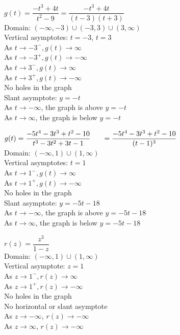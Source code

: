 \begin{exenum}
\item $g(t) = \dfrac{-t^{3} + 4t}{t^{2} - 9} = \dfrac{-t^{3} + 4t}{(t-3)(t+3)} $\\
Domain: $(-\infty, -3) \cup (-3, 3) \cup (3, \infty)$\\
Vertical asymptotes: $t = -3$, $t=3$\\
As $t \rightarrow -3^{-}, g(t) \rightarrow \infty$\\
As $t \rightarrow -3^{+}, g(t) \rightarrow -\infty$\\
As $t \rightarrow 3^{-}, g(t) \rightarrow \infty$\\
As $t \rightarrow 3^{+}, g(t) \rightarrow -\infty$\\
No holes in the graph \\
Slant asymptote: $y=-t$ \\
As $t \rightarrow -\infty$, the graph is above $y=-t$\\
As $t \rightarrow \infty$, the graph is below $y=-t$\\

\item \small $g(t) = \dfrac{-5t^{4} - 3t^{3} + t^{2} - 10}{t^{3} - 3t^{2} + 3t - 1} \\ \phantom{g(t)} = \dfrac{-5t^{4} - 3t^{3} + t^{2} - 10}{(t-1)^3} $ \normalsize \\
Domain: $(-\infty, 1) \cup (1, \infty)$\\
Vertical asymptotes: $t = 1$\\
As $t \rightarrow 1^{-}, g(t) \rightarrow \infty$\\
As $t \rightarrow 1^{+}, g(t) \rightarrow -\infty$\\
No holes in the graph \\
Slant asymptote: $y=-5t-18$ \\
 \small  As $t \rightarrow -\infty$, the graph is above $y=-5t-18$ \normalsize\\
 \small  As $t \rightarrow \infty$, the graph is below $y=-5t-18$ \normalsize \\

\item $r(z) = \dfrac{z^3}{1-z}$\\
Domain: $(-\infty, 1) \cup (1, \infty)$\\
Vertical asymptote: $z=1$\\
As $z \rightarrow 1^{-}, r(z) \rightarrow \infty$\\
As $z \rightarrow 1^{+}, r(z) \rightarrow -\infty$\\
No holes in the graph \\
No horizontal or slant asymptote \\
As $z \rightarrow -\infty$, $r(z) \rightarrow -\infty$\\
As $z \rightarrow \infty$, $r(z) \rightarrow -\infty$\\


\end{exenum}
